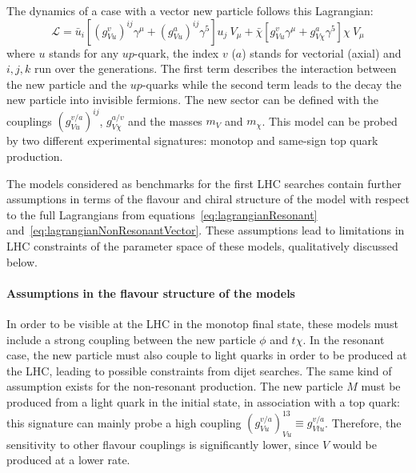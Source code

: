 The dynamics of a case with a vector new particle follows this Lagrangian:
\begin{equation}
 \label{eq:lagrangianNonResonantVector}
  \mathcal{L}  =  \bar{u}_{i} [ (g^{v}_{Vu})^{ij} \gamma^{\mu} + (g^{a}_{Vu})^{ij} \gamma^{5} ] u_{j} \: V_{\mu}  
  +  \bar{\chi} [ g^{v}_{Vu} \gamma^{\mu} + g^{a}_{V\chi} \gamma^{5} ]   \chi \: V_{\mu}
\end{equation}
where $u$ stands for any $up$-quark, the index $v$ ($a$) stands for vectorial (axial) and $i,j,k$ run over the generations.
The first term describes the interaction between the new particle and the $up$-quarks while the second term leads to the decay the new particle 
into invisible fermions. The new sector can be defined with the couplings $(g^{v/a}_{Vu})^{ij}$, 
$g^{a/v}_{V\chi}$ and the masses $m_V$ and $m_{\chi}$. 
This model can be probed by two different experimental signatures: monotop and same-sign top quark production. 
% 

 
The models considered as benchmarks for the first LHC searches
contain further assumptions in terms of the flavour and chiral structure of the model
with respect to the full Lagrangians from  equations~\eqref{eq:lagrangianResonant} and~\eqref{eq:lagrangianNonResonantVector}.
These assumptions lead to limitations in LHC constraints of 
the parameter space of these models, qualitatively discussed below. 

\paragraph{Assumptions in the flavour structure of the models}

In order to be visible at the LHC in the monotop final state, 
these models must include a strong coupling between the new particle $\phi$ and $t\chi$.
In the resonant case, the new particle must also couple to light quarks in order
to be produced at the LHC, leading to possible constraints from
dijet searches. 
The same kind of assumption exists for the non-resonant production. 
The new particle $M$ must be produced from a light quark in the initial state, 
in association with a top quark: this signature can mainly probe a high 
coupling $\left(g^{v/a}_{Vu}\right)^{13}_{Vu} \equiv g^{v/a}_{Vtu}$. Therefore,
the sensitivity to other flavour couplings is significantly lower, since $V$ would be 
produced at a lower rate. 

